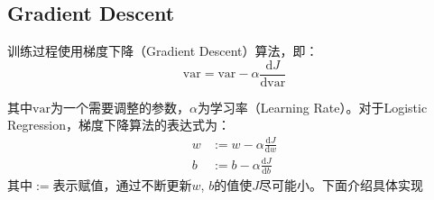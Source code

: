 	\subsection{Gradient Descent}

	训练过程使用梯度下降（Gradient Descent）算法，即：
	\begin{equation}
		\mathrm{var} = \mathrm{var} - \alpha \frac{\mathrm{d}J}{\mathrm{d}\mathrm{var}} \label{eq:gradient}
	\end{equation}

	其中$\mathrm{var}$为一个需要调整的参数，$\alpha$为学习率（Learning Rate）。对于Logistic Regression，梯度下降算法的表达式为：
	\begin{equation}
		\begin{aligned}
		w &:= w - \alpha \frac{\mathrm{d}J}{\mathrm{d}w} \\
		b &:= b - \alpha \frac{\mathrm{d}J}{\mathrm{d}b}
		\end{aligned} 
		\label{eq:gradient_logistic}
	\end{equation}
	其中$:=$表示赋值，通过不断更新$w$, $b$的值使$J$尽可能小。下面介绍具体实现

